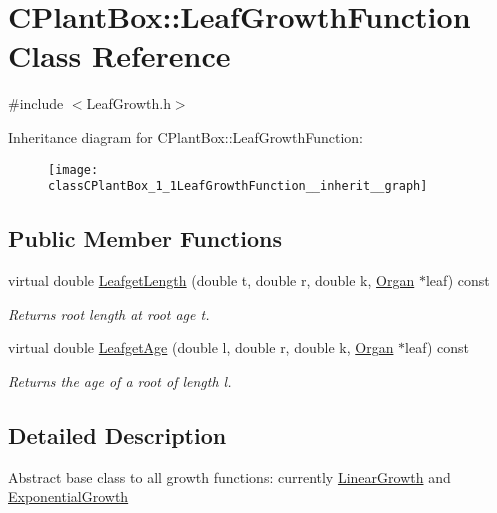 \hypertarget{classCPlantBox_1_1LeafGrowthFunction}{}\section{C\+Plant\+Box\+:\+:Leaf\+Growth\+Function Class Reference}
\label{classCPlantBox_1_1LeafGrowthFunction}


{\ttfamily \#include $<$Leaf\+Growth.\+h$>$}



Inheritance diagram for C\+Plant\+Box\+:\+:Leaf\+Growth\+Function\+:\nopagebreak
\begin{figure}[H]
\begin{center}
\leavevmode
\texttt{[image: classCPlantBox\_1\_1LeafGrowthFunction\_\_inherit\_\_graph]}
\end{center}
\end{figure}
\subsection*{Public Member Functions}
\begin{DoxyCompactItemize}
\item 
virtual double \hyperlink{classCPlantBox_1_1LeafGrowthFunction_a6261339dd2731a2cf33dc1fa111c9eaa}{Leafget\+Length} (double t, double r, double k, \hyperlink{classCPlantBox_1_1Organ}{Organ} $\ast$leaf) const
\begin{DoxyCompactList}\small\item\em Returns root length at root age t. \end{DoxyCompactList}\item 
virtual double \hyperlink{classCPlantBox_1_1LeafGrowthFunction_a0893ec299fbd7566792e2ef9e2f58f2f}{Leafget\+Age} (double l, double r, double k, \hyperlink{classCPlantBox_1_1Organ}{Organ} $\ast$leaf) const
\begin{DoxyCompactList}\small\item\em Returns the age of a root of length l. \end{DoxyCompactList}\end{DoxyCompactItemize}


\subsection{Detailed Description}
Abstract base class to all growth functions\+: currently \hyperlink{classCPlantBox_1_1LinearGrowth}{Linear\+Growth} and \hyperlink{classCPlantBox_1_1ExponentialGrowth}{Exponential\+Growth}

